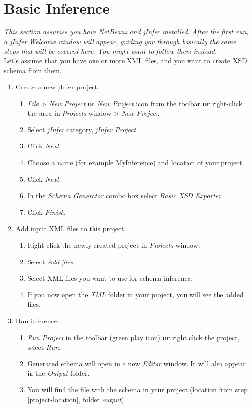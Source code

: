 \documentclass[a4paper,10pt,oneside]{article}
\begin{document}
\section{Basic Inference}
\textit{This section assumes you have NetBeans and jInfer installed. After the first run, a jInfer Welcome window will appear, guiding you through basically the same steps that will be covered here. You might want to follow them instead.}\\

Let’s assume that you have one or more XML files, and you want to create XSD schema from them.\\

\begin{enumerate}
	\item Create a new jInfer project.
	\begin{enumerate}
		\item \textit{File} > \textit{New Project} \textbf{or} \textit{New Project} icon from the toolbar \textbf{or} right-click the area in \textit{Projects} window > \textit{New Project}.
		\item Select \textit{jInfer} category, \textit{jInfer Project}.
		\item Click \textit{Next}.
		\item \label{project-location} Choose a name (for example MyInference) and location of your project.
		\item Click \textit{Next}.
		\item In the \textit{Schema Generator} combo box select \textit{Basic XSD Exporter}.
		\item Click \textit{Finish}.
	\end{enumerate}	
	\item Add input XML files to this project.
	\begin{enumerate}
		\item Right click the newly created project in \textit{Projects} window.
		\item Select \textit{Add files}.
		\item Select XML files you want to use for schema inference.
		\item If you now open the \textit{XML} folder in your project, you will see the added files.
	\end{enumerate}	
	\item Run inference.
	\begin{enumerate}
		\item \textit{Run Project} in the toolbar (green play icon) \textbf{or} right click the project, select \textit{Run}.
		\item Generated schema will open in a new \textit{Editor} window. It will also appear in the \textit{Output} folder.
		\item You will find the file with the schema in your project (location from step \ref{project-location}, folder \textit{output}).
	\end{enumerate}
\end{enumerate}
\end{document}
